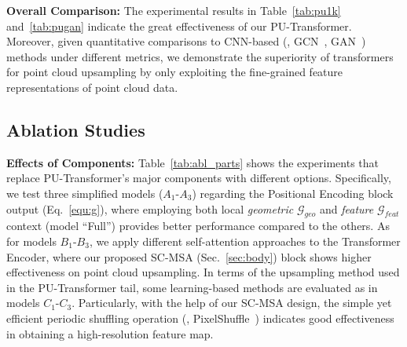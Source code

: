 \noindent \textbf{Overall Comparison:}
The experimental results in Table~\ref{tab:pu1k} and~\ref{tab:pugan} indicate the great effectiveness of our PU-Transformer. Moreover, given quantitative comparisons to CNN-based (\eg, GCN~\cite{li2019deepgcns}, GAN~\cite{goodfellow2014generative}) methods under different metrics, we demonstrate the superiority of transformers for point cloud upsampling by only exploiting the fine-grained feature representations of point cloud data.

\subsection{Ablation Studies}
\noindent \textbf{Effects of Components:}
Table~\ref{tab:abl_parts} shows the experiments that replace PU-Transformer's major components with different options. Specifically, we test three simplified models ($A_1$-$A_3$) regarding the Positional Encoding block output (Eq.~\ref{equ:g}), where employing both local \emph{geometric} $\mathcal{G}_{geo}$ and \emph{feature} $\mathcal{G}_{feat}$ context (model \enquote{Full}) provides better performance compared to the others. As for models $B_1$-$B_3$, we apply different self-attention approaches to the Transformer Encoder, where our proposed SC-MSA (Sec.~\ref{sec:body}) block shows higher effectiveness on point cloud upsampling. In terms of the upsampling method used in the PU-Transformer tail, some learning-based methods are evaluated as in models $C_1$-$C_3$. Particularly, with the help of our SC-MSA design, the simple yet efficient periodic shuffling operation (\ie, PixelShuffle~\cite{shi2016real}) indicates good effectiveness in obtaining a high-resolution feature map.   

